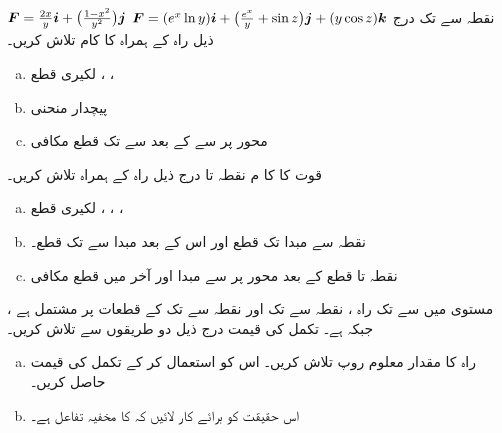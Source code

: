 \({{\boldsymbol{F}}}=\frac{2x}{y}{\boldsymbol{i}}+\big(\frac{1-x^2}{y^2}\big){\boldsymbol{j}}\)
\({{\boldsymbol{F}}}=(e^x\ln y){\boldsymbol{i}}+\big(\frac{e^x}{y}+\sin z\big){\boldsymbol{j}}+(y\cos z){\boldsymbol{k}}\)
نقطہ  سے  تک درج ذیل راہ کے ہمراہ  کا کام تلاش کریں۔
\begin{enumerate}[a.]
\item
لکیری قطع ، ، 
\item
پیچدار منحنی 
\item
محور  پر   سے  کے بعد  سے  تک قطع مکافی  
\end{enumerate}
قوت  کا کا م نقطہ  تا  درج ذیل راہ کے ہمراہ تلاش کریں۔
\begin{enumerate}[a.]
\item
لکیری قطع ، ، ، 
\item
نقطہ  سے مبدا تک قطع اور اس کے بعد مبدا سے  تک قطع۔
\item
نقطہ  تا  قطع کے بعد محور  پر  سے مبدا اور آخر میں قطع مکافی   
\end{enumerate}
مستوی  میں   سے    تک راہ ،  نقطہ   سے   تک اور نقطہ   سے    تک کے قطعات پر مشتمل ہے ، جبکہ  ہے۔ تکمل  کی قیمت درج ذیل دو طریقوں سے تلاش کریں۔
\begin{enumerate}[a.]
\item
راہ  کا  مقدار معلوم روپ تلاش کریں۔ اس کو استعمال کر کے تکمل کی قیمت حاصل کریں۔
\item
اس حقیقت کو برائے کار لائیں کہ  کا مخفیہ تفاعل   ہے۔
\end{enumerate}
